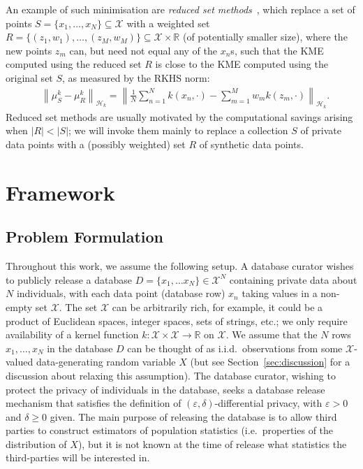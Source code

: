 \documentclass{article}
\newcommand{\calH}{\mathcal{H}}			%
\newcommand{\calX}{\mathcal{X}}			%
\newcommand{\IR}{\mathbb{R}}  			%
\theoremstyle{plain}
\theoremstyle{remark}
\theoremstyle{definition}
\begin{document}
An example of such minimisation are \emph{reduced set methods}~\citep[Chap.~18]{burges_simplified_1996, scholkopf_learning_2001}, which replace a set of points $S = \{x_1, \ldots, x_N \} \subseteq \calX$ with a weighted set $R = \{ (z_1, w_1), \ldots, (z_M, w_M) \} \subseteq \calX \times \IR$ (of potentially smaller size), where the new points $z_m$ can, but need not equal any of the $x_n$s, such that the KME computed using the reduced set $R$ is close to the KME computed using the original set $S$, as measured by the RKHS norm:
\begin{align*}
&\left\| \mu^k_S - \mu^k_R \right\|_{\calH_k}
\nonumber
=
\left\|
\frac{1}{N} \sum_{n = 1}^N k(x_n, \cdot)
- \sum_{m = 1}^M w_m k(z_m, \cdot)
\right\|_{\mathcal{H}_k}
.
\end{align*}
Reduced set methods are usually motivated by the computational savings arising when $|R| < |S|$; we will invoke them mainly to replace a collection $S$ of private data points with a (possibly weighted) set $R$ of synthetic data points.



\section{Framework}
\label{sec:framework}


\subsection{Problem Formulation}
\label{sec:framework:problem_formulation}

Throughout this work, we assume the following setup. A database curator wishes to publicly release a database $D = \{ x_1, \ldots x_N \} \in \calX^N$ containing private data about $N$ individuals, with each data point (database row) $x_n$ taking values in a non-empty set $\calX$. The set $\calX$ can be arbitrarily rich, for example, it could be a product of Euclidean spaces, integer spaces, sets of strings, etc.; we only require availability of a kernel function $k : \calX \times \calX \to \IR$ on $\calX$. We assume that the $N$ rows $x_1, \ldots, x_N$ in the database $D$ can be thought of as i.i.d.~observations from some $\calX$-valued data-generating random variable $X$ (but see Section~\ref{sec:discussion} for a discussion about relaxing this assumption). The database curator, wishing to protect the privacy of individuals in the database, seeks a database release mechanism that satisfies the definition of $(\varepsilon, \delta)$-differential privacy, with $\varepsilon > 0$ and $\delta \geq 0$ given. The main purpose of releasing the database is to allow third parties to construct estimators of population statistics (i.e.~properties of the distribution of $X$), but it is not known at the time of release what statistics the third-parties will be interested in.
\end{document}
